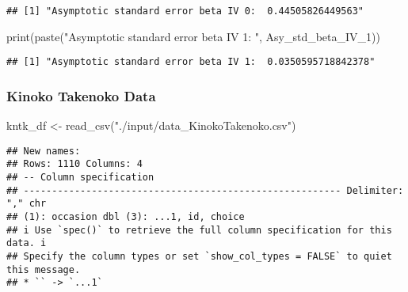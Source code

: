 \documentclass[
]{article}
\newenvironment{Shaded}{\begin{snugshade}}{\end{snugshade}}
\newcommand{\FunctionTok}[1]{\textcolor[rgb]{0.00,0.00,0.00}{#1}}
\newcommand{\NormalTok}[1]{#1}
\newcommand{\OtherTok}[1]{\textcolor[rgb]{0.56,0.35,0.01}{#1}}
\newcommand{\StringTok}[1]{\textcolor[rgb]{0.31,0.60,0.02}{#1}}
\begin{document}
\begin{verbatim}
## [1] "Asymptotic standard error beta IV 0:  0.44505826449563"
\end{verbatim}

\begin{Shaded}
\begin{Highlighting}[]
\FunctionTok{print}\NormalTok{(}\FunctionTok{paste}\NormalTok{(}\StringTok{"Asymptotic standard error beta IV 1: "}\NormalTok{, Asy\_std\_beta\_IV\_1))}
\end{Highlighting}
\end{Shaded}

\begin{verbatim}
## [1] "Asymptotic standard error beta IV 1:  0.0350595718842378"
\end{verbatim}

\hypertarget{kinoko-takenoko-data}{%
\subsubsection{Kinoko Takenoko Data}\label{kinoko-takenoko-data}}

\begin{Shaded}
\begin{Highlighting}[]
\NormalTok{kntk\_df }\OtherTok{\textless{}{-}} \FunctionTok{read\_csv}\NormalTok{(}\StringTok{"./input/data\_KinokoTakenoko.csv"}\NormalTok{)}
\end{Highlighting}
\end{Shaded}

\begin{verbatim}
## New names:
## Rows: 1110 Columns: 4
## -- Column specification
## -------------------------------------------------------- Delimiter: "," chr
## (1): occasion dbl (3): ...1, id, choice
## i Use `spec()` to retrieve the full column specification for this data. i
## Specify the column types or set `show_col_types = FALSE` to quiet this message.
## * `` -> `...1`
\end{verbatim}
\end{document}
